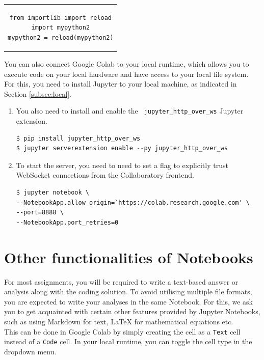 \documentclass[a4paper,10pt]{article}
\begin{document}
\begin{center}
\begin{tabular}{c}
\begin{lstlisting}[linewidth=7.5cm]
from importlib import reload
import mypython2
mypython2 = reload(mypython2)
\end{lstlisting}
\end{tabular}
\end{center}

You can also connect Google Colab to your local runtime, which allows you to execute code on your local hardware and have access to your local file system. For this, you need to install Jupyter to your local machine, as indicated in Section \ref{subsec:local}.

\begin{enumerate}
    \item You also need to install and enable the \texttt{ jupyter\_http\_over\_ws} Jupyter extension.
    
\begin{lstlisting}[linewidth=12cm, language=Python]
$ pip install jupyter_http_over_ws
$ jupyter serverextension enable --py jupyter_http_over_ws
\end{lstlisting}

    \item To start the server, you need to need to set a flag to explicitly trust WebSocket connections from the Collaboratory frontend.
 
\begin{lstlisting}[linewidth=13cm]
$ jupyter notebook \
--NotebookApp.allow_origin=`https://colab.research.google.com' \
--port=8888 \
--NotebookApp.port_retries=0
\end{lstlisting}
\end{enumerate}

\section{Other functionalities of Notebooks}
For most assignments, you will be required to write a text-based answer or analysis along with the coding solution. To avoid utilising multiple file formats, you are expected to write your analyses in the same Notebook. For this, we ask you to get acquainted with certain other features provided by Jupyter Notebooks, such as using Markdown for text, LaTeX for mathematical equations etc.\\

This can be done in Google Colab by simply creating the cell as a \texttt{Text} cell instead of a \texttt{Code} cell. In your local runtime, you can toggle the cell type in the dropdown menu. \\
\end{document}
